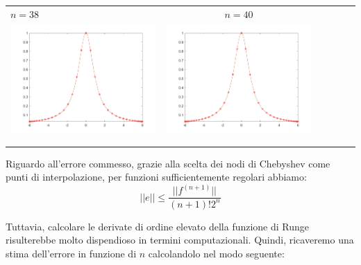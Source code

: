 \begin{tabular}{l*{5}{c}}
\hspace{3.5cm}\(n=38\) &  \(n=40\) \\
\includegraphics[scale=0.5]{cap4/4_7/38.png} &  \includegraphics[scale=0.5]{cap4/4_7/40.png} \\
& \\
& \\
\end{tabular}


\noindent Riguardo all'errore commesso, grazie alla scelta dei nodi di Chebyshev come punti di interpolazione, per funzioni sufficientemente regolari abbiamo:
\[
||e|| \leq \frac{||f^{(n+1)}||}{(n+1)!2^n}
\]

\noindent Tuttavia, calcolare le derivate di ordine elevato della funzione di Runge risulterebbe molto dispendioso in termini computazionali. Quindi, ricaveremo una stima dell'errore in funzione di $n$ calcolandolo nel modo seguente:

